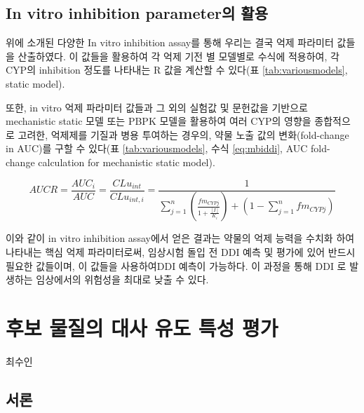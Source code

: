 \documentclass[
  11pt,
  krantz2, a4paper, twoside]{krantz}
\begin{document}
\hypertarget{in-vitro-inhibition-parameteruxc758-uxd65cuxc6a9}{%
\section{In vitro inhibition parameter의 활용}\label{in-vitro-inhibition-parameteruxc758-uxd65cuxc6a9}}

위에 소개된 다양한 In vitro inhibition assay를 통해 우리는 결국 억제
파라미터 값들을 산출하였다. 이 값들을 활용하여 각 억제 기전 별 모델별로
수식에 적용하여, 각 CYP의 inhibition 정도를 나타내는 R 값을 계산할 수
있다(표 \ref{tab:variousmodels}, static model).

또한, in vitro 억제 파라미터 값들과 그 외의 실험값 및 문헌값을 기반으로
mechanistic static 모델 또는 PBPK 모델을 활용하여 여러 CYP의 영향을
종합적으로 고려한, 억제제를 기질과 병용 투여하는 경우의, 약물 노출 값의
변화(fold-change in AUC)를 구할 수 있다(표 \ref{tab:variousmodels},
수식 \eqref{eq:mbiddi}, AUC fold-change calculation for mechanistic
static model).

\begin{equation}
AUCR = \frac{AUC_i}{AUC} = \frac{CLu_{int}}{CLu_{int,i}} = 
\frac{1}{\sum_{j=1}^{n} (\frac{fm_{CYPj}}{1+\frac{[I]}{K_i}}) 
+ (1-\sum_{j=1}^{n}fm_{CYPj})}
\label{eq:mbiddi} 
\end{equation}

이와 같이 in vitro inhibition assay에서 얻은 결과는 약물의 억제 능력을
수치화 하여 나타내는 핵심 억제 파라미터로써, 임상시험 돌입 전 DDI 예측
및 평가에 있어 반드시 필요한 값들이며, 이 값들을 사용하여DDI 예측이
가능하다. 이 과정을 통해 DDI 로 발생하는 임상에서의 위험성을 최대로 낮출
수 있다.

\hypertarget{Induction}{%
\chapter{후보 물질의 대사 유도 특성 평가}\label{Induction}}

\Large\hfill

최수인

\normalsize

\hypertarget{uxc11cuxb860-5}{%
\section{서론}\label{uxc11cuxb860-5}}
\end{document}
